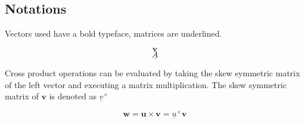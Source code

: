 \subsection{Notations}

Vectors used have a bold typeface, matrices are underlined. 

\begin{equation*}
\textbf{v}
\end{equation*}
\begin{equation*}
\underline{A}
\end{equation*}

Cross product operations can be evaluated by taking the skew symmetric matrix of the left vector and executing a matrix multiplication. The skew symmetric matrix of $\textbf{v}$ is denoted as $\underline{v}^\times$

\begin{equation*}
	\textbf{w} = \textbf{u} \times \textbf{v} = \underline{u}^\times \textbf{v}
\end{equation*}